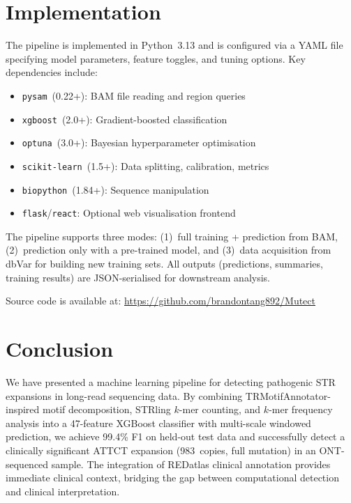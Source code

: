 \documentclass[11pt,twocolumn]{article}
\begin{document}
\section{Implementation}\label{sec:implementation}

The pipeline is implemented in Python~3.13 and is configured via a
YAML file specifying model parameters, feature toggles, and tuning
options.  Key dependencies include:

\begin{itemize}[nosep]
    \item \texttt{pysam}~(0.22+): BAM file reading and region queries
    \item \texttt{xgboost}~(2.0+): Gradient-boosted classification
    \item \texttt{optuna}~(3.0+): Bayesian hyperparameter optimisation
    \item \texttt{scikit-learn}~(1.5+): Data splitting, calibration, metrics
    \item \texttt{biopython}~(1.84+): Sequence manipulation
    \item \texttt{flask}/\texttt{react}: Optional web visualisation frontend
\end{itemize}

The pipeline supports three modes: (1)~full training + prediction from
BAM, (2)~prediction only with a pre-trained model, and (3)~data
acquisition from dbVar for building new training sets.  All outputs
(predictions, summaries, training results) are JSON-serialised for
downstream analysis.

Source code is available at:
\url{https://github.com/brandontang892/Mutect}

\section{Conclusion}\label{sec:conclusion}

We have presented a machine learning pipeline for detecting pathogenic
STR expansions in long-read sequencing data.  By combining
TRMotifAnnotator-inspired motif decomposition, STRling $k$-mer counting,
and $k$-mer frequency analysis into a 47-feature XGBoost classifier with
multi-scale windowed prediction, we achieve 99.4\% F1 on held-out test
data and successfully detect a clinically significant ATTCT expansion
(983~copies, full mutation) in an ONT-sequenced sample.  The integration
of REDatlas clinical annotation provides immediate clinical context,
bridging the gap between computational detection and clinical
interpretation.
\end{document}
